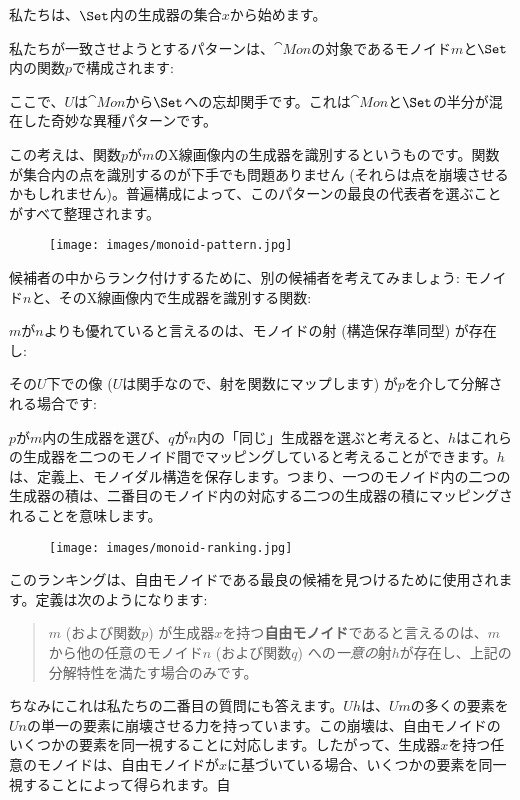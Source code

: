 私たちは、$\Set$内の生成器の集合$x$から始めます。

私たちが一致させようとするパターンは、$\cat{Mon}$の対象であるモノイド$m$と$\Set$内の関数$p$で構成されます: 

ここで、$U$は$\cat{Mon}$から$\Set$への忘却関手です。これは$\cat{Mon}$と$\Set$の半分が混在した奇妙な異種パターンです。

この考えは、関数$p$が$m$のX線画像内の生成器を識別するというものです。関数が集合内の点を識別するのが下手でも問題ありません (それらは点を崩壊させるかもしれません)。普遍構成によって、このパターンの最良の代表者を選ぶことがすべて整理されます。

\begin{figure}[H]
  \centering
  \texttt{[image: images/monoid-pattern.jpg]}
\end{figure}

\noindent
候補者の中からランク付けするために、別の候補者を考えてみましょう: モノイド$n$と、そのX線画像内で生成器を識別する関数: 

$m$が$n$よりも優れていると言えるのは、モノイドの射 (構造保存準同型) が存在し: 

その$U$下での像 ($U$は関手なので、射を関数にマップします) が$p$を介して分解される場合です: 

$p$が$m$内の生成器を選び、$q$が$n$内の「同じ」生成器を選ぶと考えると、$h$はこれらの生成器を二つのモノイド間でマッピングしていると考えることができます。$h$は、定義上、モノイダル構造を保存します。つまり、一つのモノイド内の二つの生成器の積は、二番目のモノイド内の対応する二つの生成器の積にマッピングされることを意味します。

\begin{figure}[H]
  \centering
  \texttt{[image: images/monoid-ranking.jpg]}
\end{figure}

\noindent
このランキングは、自由モノイドである最良の候補を見つけるために使用されます。定義は次のようになります: 

\begin{quote}
  $m$ (および関数$p$) が生成器$x$を持つ\textbf{自由モノイド}であると言えるのは、$m$から他の任意のモノイド$n$ (および関数$q$) への\emph{一意の}射$h$が存在し、上記の分解特性を満たす場合のみです。
\end{quote}
ちなみにこれは私たちの二番目の質問にも答えます。$U h$は、$U m$の多くの要素を$U n$の単一の要素に崩壊させる力を持っています。この崩壊は、自由モノイドのいくつかの要素を同一視することに対応します。したがって、生成器$x$を持つ任意のモノイドは、自由モノイドが$x$に基づいている場合、いくつかの要素を同一視することによって得られます。自

